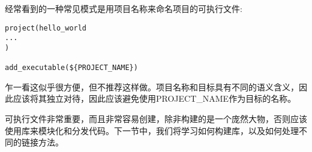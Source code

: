 经常看到的一种常见模式是用项目名称来命名项目的可执行文件:

\begin{lstlisting}[style=styleCMake]
project(hello_world
...
)

add_executable(${PROJECT_NAME})
\end{lstlisting}

乍一看这似乎很方便，但不推荐这样做。项目名称和目标具有不同的语义含义，因此应该将其独立对待，因此应该避免使用PROJECT\_NAME作为目标的名称。

可执行文件非常重要，而且非常容易创建，除非构建的是一个庞然大物，否则应该使用库来模块化和分发代码。下一节中，我们将学习如何构建库，以及如何处理不同的链接方法。





























